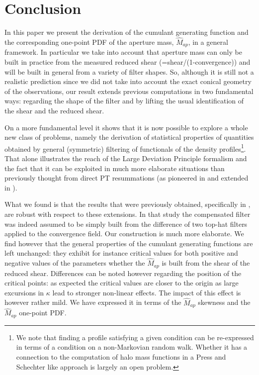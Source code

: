\documentclass[twocolumn,aps,reprint, nofootinbib]{revtex4}
\newcommand{\Map}{\hat{M}_{ap}}
\begin{document}
\section{Conclusion}

In this paper we present the derivation of the cumulant generating function and the corresponding one-point PDF of  the aperture mass, $\Map$, in a general framework. In particular we take into account that aperture mass can only be built in practice from the measured reduced shear (=shear/(1-convergence)) and will be built in general  from a variety of filter shapes. So, although it is still not a realistic prediction since we did not take into account the exact conical geometry of the observations, our result extends previous computations in two fundamental ways: regarding the shape of the filter and by lifting the usual identification of the shear and the reduced shear.

On a more fundamental level it shows that it is now possible to explore a whole new class of problems, namely the derivation of statistical properties of quantities obtained by general (symmetric) filtering of functionals of the density profiles\footnote{We note that finding a profile satisfying a given condition can be re-expressed in terms of a condition on a non-Markovian random walk. Whether it has a connection to  the computation of halo mass functions in a Press and Schechter like approach is largely an open problem.}. That alone illustrates the reach of the Large Deviation Principle formalism and the fact that it can be exploited in much more elaborate situations than previously thought from direct PT resummations (as pioneered in \cite{1992ApJ...392....1B, 1994A&A...291..697B} and extended in \cite{bernardeau2014statistics}). 

What we found is that the results that were previously obtained, specifically in \cite{bernardeau2000construction}, 
are robust with respect to these extensions. In that study
the compensated filter was indeed assumed to be simply built from the difference of two top-hat filters applied to the convergence field. Our construction is much more elaborate. We find however that the general properties of the cumulant generating functions are left unchanged: they exhibit for instance critical values for both positive and negative values of the parameters whether the $\Map$ is built from the shear of the reduced shear. Differences can be noted however regarding the position of the critical points: as expected the critical values are closer to the origin as large excursions in $\kappa$ lead to stronger non-linear effects. The impact of this effect is however rather mild. We have expressed it in terms of the $\Map$ skewness and the $\Map$ one-point PDF. 
\end{document}
